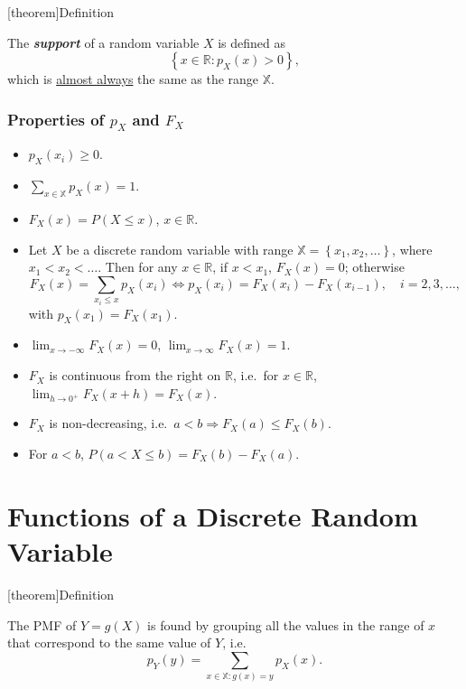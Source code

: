 \documentclass[12pt]{report}
\theoremstyle{definition}
\begin{document}
[theorem]{Definition}
\begin{support}
    The \textbf{\emph{support}} of a random variable $X$ is defined as
    \[
        \left\{x\in\mathbb{R}: p_X(x)>0\right\},
    \]
    which is \underline{almost always} the same as the range $\mathbb{X}$.
\end{support}

\subsubsection{Properties of $p_X$ and $F_X$}
\begin{itemize}
    \item $p_X(x_i)\ge 0$.
    \item $\sum_{x\in\mathbb{X}} p_X(x)=1$.
    \item $F_X(x)=P(X\le x)$, $x\in\mathbb{R}$.
    \item Let $X$ be a discrete random variable with range
        $\mathbb{X}=\left\{x_1,x_2,\ldots\right\}$, where $x_1<x_2<\ldots$.
        Then for any $x\in\mathbb{R}$, if $x<x_1$, $F_X(x)=0$; otherwise
        \[
            F_X(x)=\sum_{x_i\le x} p_X(x_i) \iff p_X(x_i)=F_X(x_i)-F_X(x_{i-1}),
                \quad i=2,3,\ldots,
        \]
        with $p_X(x_1)=F_X(x_1)$.
    \item $\lim_{x\rightarrow-\infty}F_X(x)=0$,
        $\lim_{x\rightarrow\infty}F_X(x)=1$.
    \item $F_X$ is continuous from the right on $\mathbb{R}$, i.e.\ for
        $x\in\mathbb{R}$, $\lim_{h\rightarrow 0^{+}}F_X(x+h)=F_X(x)$.
    \item $F_X$ is non-decreasing, i.e.\
        $a<b \Longrightarrow F_X(a)\le F_X(b)$.
    \item For $a<b$, $P(a<X\le b)=F_X(b)-F_X(a)$.
\end{itemize} 

\section{Functions of a Discrete Random Variable}

[theorem]{Definition}
\begin{pmf of g(X)}
    The PMF of $Y=g(X)$ is found by grouping all the values in the range of $x$
    that correspond to the same value of $Y$, i.e.\
    \[
        p_{Y}(y)=\sum_{x\in\mathbb{X}:g(x)=y} p_X(x).
    \]
\end{pmf of g(X)}
\end{document}
